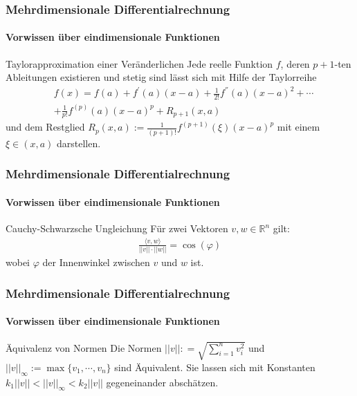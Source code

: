 \documentclass{beamer}
\begin{document}
\begin{frame}
    \frametitle{Mehrdimensionale Differentialrechnung}
\framesubtitle{Vorwissen über eindimensionale  Funktionen}
    \begin{block}{Taylorapproximation einer Veränderlichen}
Jede  reelle Funktion $f$, deren $p+1$-ten Ableitungen existieren und stetig sind lässt sich mit Hilfe der Taylorreihe  
\begin{align*}
&f(x) = f(a) + f^{'}(a) (x-a) +   \frac{1}{2!} f^{''}(a) (x-a)^2 + \cdots  \\
& +  \frac{1}{p!} f^{(p)}(a) (x-a)^{p} +  R_{p+1}(x,a) 
\end{align*}
und dem Restglied  $R_p(x,a) :=   \frac{1}{(p+1)!} f^{(p+1)}(\xi) (x-a)^{p} $ mit einem $\xi \in (x,a)$ darstellen.
\end{block}

 \end{frame}

\begin{frame}
    \frametitle{Mehrdimensionale Differentialrechnung}
\framesubtitle{Vorwissen über eindimensionale  Funktionen}
    \begin{block}{Cauchy-Schwarzsche Ungleichung}
 Für zwei Vektoren $v,w \in \mathbb{R}^n$ gilt: 
\begin{align*}
\frac{\langle v, w \rangle}{||v|| \cdot ||w||} = \cos(\varphi) 
\end{align*}
wobei $\varphi$ der Innenwinkel zwischen $v$ und $w$ ist.
\end{block}

 \end{frame}


\begin{frame}
    \frametitle{Mehrdimensionale Differentialrechnung}
\framesubtitle{Vorwissen über eindimensionale  Funktionen}
    \begin{block}{Äquivalenz von Normen}
 Die Normen $||v||: = \sqrt{\sum_{i = 1}^n v_i^2}$ und $||v||_{\infty}:= \max \{ v_1, \cdots, v_n \} $ sind Äquivalent. Sie lassen sich  mit Konstanten $k_1 ||v|| < ||v||_{\infty}  < k_2  ||v|| $ gegeneinander abschätzen.
\end{block}

 \end{frame}
\end{document}
